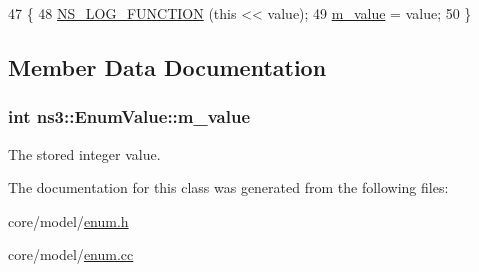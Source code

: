 \begin{DoxyCode}
47 \{
48   \hyperlink{log-macros-disabled_8h_a90b90d5bad1f39cb1b64923ea94c0761}{NS\_LOG\_FUNCTION} (\textcolor{keyword}{this} << value);
49   \hyperlink{classns3_1_1EnumValue_a8c2ab33703e2a542f702d48cfc660c18}{m\_value} = value;
50 \}
\end{DoxyCode}


\subsection{Member Data Documentation}
\subsubsection[{\texorpdfstring{m\+\_\+value}{m_value}}]{\setlength{\rightskip}{0pt plus 5cm}int ns3\+::\+Enum\+Value\+::m\+\_\+value\hspace{0.3cm}{\ttfamily [private]}}\hypertarget{classns3_1_1EnumValue_a8c2ab33703e2a542f702d48cfc660c18}{}\label{classns3_1_1EnumValue_a8c2ab33703e2a542f702d48cfc660c18}


The stored integer value. 



The documentation for this class was generated from the following files\+:\begin{DoxyCompactItemize}
\item 
core/model/\hyperlink{enum_8h}{enum.\+h}\item 
core/model/\hyperlink{enum_8cc}{enum.\+cc}\end{DoxyCompactItemize}
